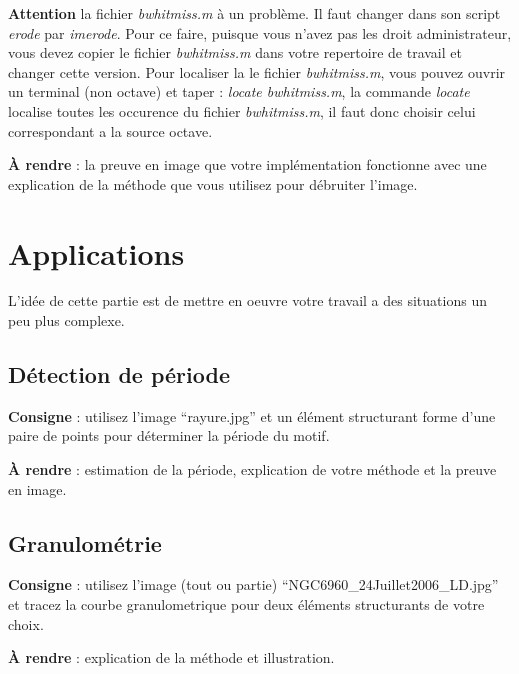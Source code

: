 \documentclass[10pt,a4paper]{article}
\begin{document}
\textbf{Attention } la fichier \textit{bwhitmiss.m} \`{a} un probl\`{e}me. Il faut changer dans son script \textit{erode} par \textit{imerode}. Pour ce faire, puisque vous n'avez pas les droit administrateur, vous devez copier le fichier \textit{bwhitmiss.m} dans votre repertoire de travail et changer cette version. Pour localiser la le fichier  \textit{bwhitmiss.m}, vous pouvez ouvrir un terminal (non octave) et taper :  \textit{locate bwhitmiss.m}, la commande \textit{locate} localise toutes les occurence du fichier  \textit{bwhitmiss.m}, il faut donc choisir celui correspondant a la source octave.

\noindent\textbf{\`{A} rendre} : la preuve en image que votre impl\'{e}mentation fonctionne avec une explication de la m\'{e}thode que vous utilisez pour d\'{e}bruiter l'image.

\section{Applications}
L'id\'{e}e de cette partie est de mettre en oeuvre votre travail a des situations un peu plus complexe.
\subsection{D\'{e}tection de p\'{e}riode}
\textbf{Consigne} : utilisez l'image ``rayure.jpg'' et un \'{e}l\'{e}ment structurant forme d'une paire de points pour d\'{e}terminer la p\'{e}riode du motif.

\noindent\textbf{\`{A} rendre} : estimation de la p\'{e}riode, explication de votre m\'{e}thode et la preuve en image.

\subsection{Granulom\'{e}trie}
\textbf{Consigne} : utilisez l'image (tout ou partie) ``NGC6960\_24Juillet2006\_LD.jpg'' et tracez la courbe granulometrique pour deux \'{e}l\'{e}ments structurants de votre choix.

\noindent\textbf{\`{A} rendre} : explication de la m\'{e}thode et illustration.
\end{document}

